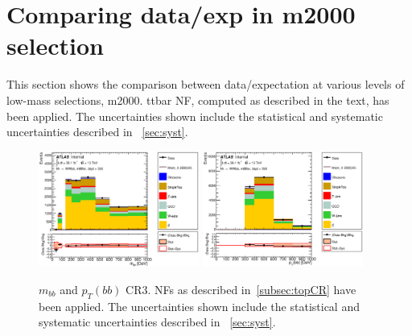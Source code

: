 \section {Comparing data/exp in m2000 selection}
\label{app:data_exp_reOpt2000}
This section shows the comparison between data/expectation at various levels of low-mass selections, m2000. ttbar NF, computed as described in the text, has been applied. The uncertainties shown include the statistical and systematic uncertainties described in ~\ref{sec:syst}.

\begin{figure}[!h]
\begin{center}
\includegraphics*[width=0.47\textwidth] {figures/ControlPlots/reOpt2000/C_mBBcr_reOpt2000_bbpt350_bbMass_regionA_met25d020.eps}
\includegraphics*[width=0.47\textwidth] {figures/ControlPlots/reOpt2000/C_mBBcr_reOpt2000_bbpt350_bbPt_regionA_met25d020.eps}
\caption[$m_{bb}$ and  $p_{T}(bb)$ CR3.]{$m_{bb}$ and  $p_{T}(bb)$ CR3.  \ttbar NFs as described in~\ref{subsec:topCR} have been applied. The uncertainties shown include the statistical and systematic uncertainties described in ~\ref{sec:syst}.}
\end{center}
\end{figure}


